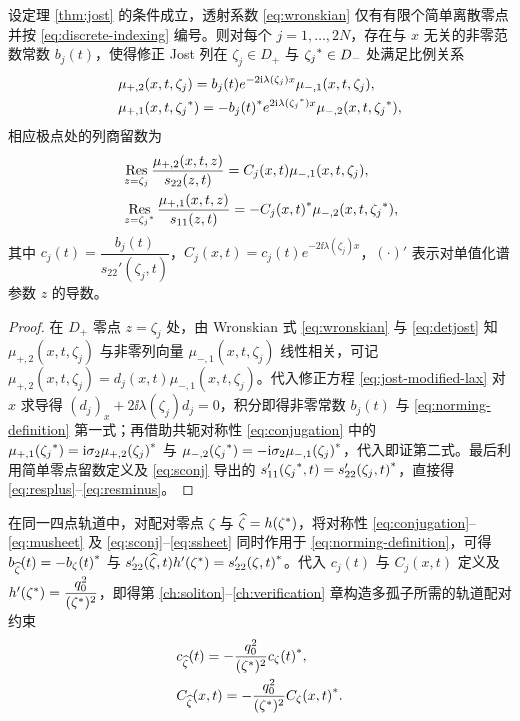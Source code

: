 \begin{proposition}\label{prop:quartet}\label{prop:respair}
设定理 \ref{thm:jost} 的条件成立，透射系数 \eqref{eq:wronskian} 仅有有限个简单离散零点并按 \eqref{eq:discrete-indexing} 编号。则对每个 $j=1,\ldots,2N$，存在与 $x$ 无关的非零范数常数 $b_j(t)$，使得修正 Jost 列在 $\zeta_j\in D_+$ 与 ${\zeta_j}^{*}\in D_-$ 处满足比例关系
\begin{equation}\label{eq:norming-definition}
\begin{aligned}
&\mu_{+,2}(x,t,\zeta_j)=b_j(t)e^{-2\mathrm{i}\lambda(\zeta_j)x}\mu_{-,1}(x,t,\zeta_j),\\
&\mu_{+,1}(x,t,{\zeta_j}^{*})=-{b_j(t)}^{*}e^{2\mathrm{i}\lambda({\zeta_j}^{*})x}\mu_{-,2}(x,t,{\zeta_j}^{*}),
\end{aligned}
\end{equation}
相应极点处的列商留数为
\begin{align}
&\operatorname*{Res}\limits_{z=\zeta_j}\dfrac{\mu_{+,2}(x,t,z)}{s_{22}(z,t)}
=C_j(x,t)\mu_{-,1}(x,t,\zeta_j),\label{eq:resplus}\\
&\operatorname*{Res}\limits_{z={\zeta_j}^{*}}\dfrac{\mu_{+,1}(x,t,z)}{s_{11}(z,t)}
=-{C_j(x,t)}^{*}\mu_{-,2}(x,t,{\zeta_j}^{*}),\label{eq:resminus}
\end{align}
其中 $c_j(t)=\dfrac{b_j(t)}{s_{22}'(\zeta_j,t)}$，$C_j(x,t)=c_j(t)e^{-2\ii\lambda(\zeta_j)x}$，$(\cdot)'$ 表示对单值化谱参数 $z$ 的导数。
\end{proposition}
\begin{proof}
在 $D_+$ 零点 $z=\zeta_j$ 处，由 Wronskian 式 \eqref{eq:wronskian} 与 \eqref{eq:detjost} 知 $\mu_{+,2}(x,t,\zeta_j)$ 与非零列向量 $\mu_{-,1}(x,t,\zeta_j)$ 线性相关，可记 $\mu_{+,2}(x,t,\zeta_j)=d_j(x,t)\mu_{-,1}(x,t,\zeta_j)$。代入修正方程 \eqref{eq:jost-modified-lax} 对 $x$ 求导得 $(d_j)_x+2\ii\lambda(\zeta_j)d_j=0$，积分即得非零常数 $b_j(t)$ 与 \eqref{eq:norming-definition} 第一式；再借助共轭对称性 \eqref{eq:conjugation} 中的 $\mu_{+,1}({\zeta_j}^{*})=\mathrm{i}\sigma_2{\mu_{+,2}(\zeta_j)}^{*}$ 与 $\mu_{-,2}({\zeta_j}^{*})=-\mathrm{i}\sigma_2{\mu_{-,1}(\zeta_j)}^{*}$，代入即证第二式。最后利用简单零点留数定义及 \eqref{eq:sconj} 导出的 $s_{11}'({\zeta_j}^{*},t)={s_{22}'(\zeta_j,t)}^{*}$，直接得 \eqref{eq:resplus}--\eqref{eq:resminus}。
\end{proof}

\begin{remark}
在同一四点轨道中，对配对零点 $\zeta$ 与 $\widehat\zeta=h({\zeta}^{*})$，将对称性 \eqref{eq:conjugation}--\eqref{eq:musheet} 及 \eqref{eq:sconj}--\eqref{eq:ssheet} 同时作用于 \eqref{eq:norming-definition}，可得 $b_{\widehat\zeta}(t)=-{b_\zeta(t)}^{*}$ 与 $s_{22}'(\widehat\zeta,t)h'({\zeta}^{*})={s_{22}'(\zeta,t)}^{*}$。代入 $c_j(t)$ 与 $C_j(x,t)$ 定义及 $h'({\zeta}^{*})=\dfrac{q_0^2}{({\zeta}^{*})^2}$，即得第 \ref{ch:soliton}--\ref{ch:verification} 章构造多孤子所需的轨道配对约束
\begin{align}
&c_{\widehat\zeta}(t)=-\dfrac{q_0^2}{({\zeta}^{*})^2}{c_\zeta(t)}^{*},\label{eq:cpair}\\
&C_{\widehat\zeta}(x,t)=-\dfrac{q_0^2}{({\zeta}^{*})^2}{C_\zeta(x,t)}^{*}.\label{eq:Cpair}
\end{align}
\end{remark}

